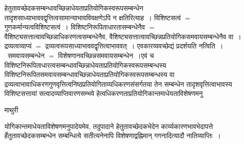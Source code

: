 \documentclass[10pt, openany]{book}
\begin{document}
{हेतुतावच्छेदकसम्बन्धावच्छिन्नाधेयताप्रतियोगिकस्वरूपसम्बन्धेन तादृशसाध्याभाववद्वृत्तित्वसामान्याभावविवक्षणेऽपि न क्षतिरित्याह~। विशिष्टसत्वं $=$ गुणकर्मान्यत्वविशिष्टसत्वं~। विशिष्टनिरूपिताधारतासम्बन्धेनैव $=$  वैशिष्ट्यसत्तात्वावच्छिन्नाधिकरणत्वसम्बन्धेनैव, वैशिष्ट्यसत्तात्वावच्छिन्नप्रतियोगिकसमवायसम्बन्धेनैव वा~। द्रव्यत्वव्याप्यं $=$ द्रव्यत्वरूपसाध्याभाववद्वृत्तित्वाभाववत्~। एवकारव्यवच्छेद्यं प्रदर्शयति {\la नत्विति~।}~समवायसम्बन्धेन $=$ विशेषणानवच्छिन्नसमवायसम्बन्धेन~।एवं च विशिष्टनिरूपिताधारत्वसम्बन्धावच्छिन्नाधेयताप्रतियोगिकस्वरूपसम्बन्धस्य विशिष्टनिरूपितसमवायसम्बन्धावच्छिन्नाधेयताप्रतियोगिकस्वरूपसम्बन्धस्य वा द्रव्यत्वाभावाधिकरणगुणवृत्तित्वनिष्ठप्रतियोगिताव्यधिकरणसंसर्गतया तेन सम्बन्धेन तादृशवृत्तित्वाभावस्य विशिष्टसत्तायां सत्वादव्याप्तिवारणसम्भवे हेत्वधिकरणताप्रतियोगिकान्तमाधेयताविशेषणमनु
\newpage
\begin{center}  माथुरी  \end{center}
{\la योगिकान्तमाधेयताविशेषणमनुपादेयमेव, तदुपादाने हेतुतावच्छेदकभेदेन कार्य्यकारणभावभेदापत्ते र्हेतुतावच्छेदकसम्बन्धेन सम्बन्धित्वे सतीत्यनेनापि विशेषणाद्वह्निमान् गगनादित्यादौ नातिव्याप्तिः~।~\\

}}
\end{document}
